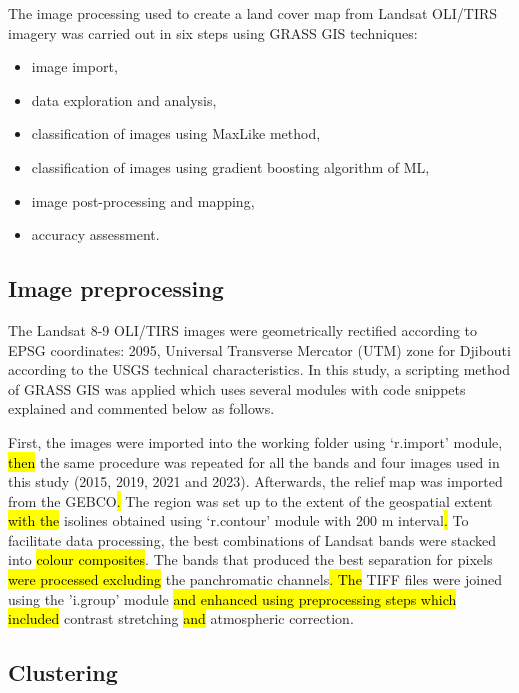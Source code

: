 \documentclass[jimaging,article,submit,pdftex,moreauthors]{Definitions/mdpi}
\begin{document}
The\hl{ }image processing used to create a land cover map from Landsat OLI/TIRS imagery was carried out in six steps using GRASS GIS techniques: 
\begin{itemize}
	\item image import, 
	\item data exploration and analysis, 
	\item classification of images using MaxLike method, 
	\item classification of images using gradient boosting algorithm of ML, 
	\item image post-processing and mapping,  
	\item accuracy assessment. 
\end{itemize}

\subsection{Image preprocessing}

The Landsat 8-9 OLI/TIRS images were geometrically rectified according to EPSG coordinates: 2095, Universal Transverse Mercator (UTM) zone for Djibouti according to the USGS technical characteristics. In this study, a scripting method of GRASS GIS was applied which uses several modules with code snippets explained and commented below as follows. 

First, the images were imported into the working folder using ‘r.import’ module,\hl{ then }the same procedure was repeated for all the bands and four images used in this study (2015, 2019, 2021 and 2023). Afterwards, the relief map was imported from the GEBCO\hl{. }The region was set up to the extent of the geospatial extent \hl{with the} isolines\hl{ }obtained\hl{ }using ‘r.contour’ module\hl{ }with 200 m interval\hl{.} To facilitate data processing, the best combinations of Landsat bands were\hl{ }stacked into \hl{colour composites}. The bands that produced the best separation for pixels \hl{were processed excluding} the panchromatic channels\hl{. The} TIFF files were joined using the 'i.group' module \hl{and enhanced using preprocessing steps which included} contrast stretching\hl{ and }atmospheric correction. 

\subsection{Clustering}
\end{document}

